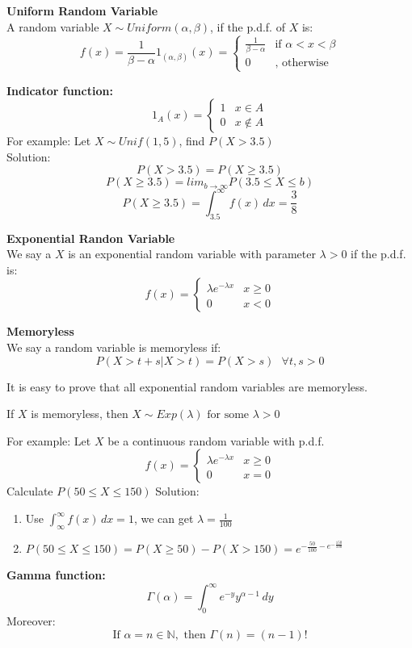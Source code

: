 \documentclass{article}
\begin{document}
\begin{definition}
    \textbf{Uniform Random Variable}\\
    A random variable $X \sim Uniform(\alpha,\beta)$, if the p.d.f. of $X$ is:
    \[
    f(x) = \frac{1}{\beta - \alpha} 1_{(\alpha, \beta)}(x) = 
    \begin{cases} 
    \frac{1}{\beta - \alpha} & \text{if } \alpha < x <\beta\\
    0 & \text{, otherwise}  
    \end{cases}
    \]
\end{definition}
\textbf{Indicator function:} 
\[
 1_A(x) =
 \begin{cases}
  1   &  x \in A \\
  0   &  x \notin A
 \end{cases}
\]
For example: Let $X \sim Unif(1,5)$, find $P(X > 3.5)$\\
Solution:
$$ P(X>3.5) = P(X \geq 3.5)$$
$$ P(X \geq 3.5) = lim_{b \rightarrow \infty}P(3.5 \leq X \leq b)$$
$$ P(X \geq 3.5) = \int^{\infty}_{3.5} f(x)\, dx = \frac{3}{8}$$

\begin{definition}
    \textbf{Exponential Randon Variable}\\
    We say a $X$ is an exponential random variable with parameter $\lambda > 0$ if the p.d.f. is:
    \[
    f(x) = 
    \begin{cases}
        \lambda e^{-\lambda x} & x \geq 0 \\
        0 & x < 0
    \end{cases}
    \]
\end{definition}

\begin{definition}
    \textbf{Memoryless}\\
    We say a random variable is memoryless if:
    $$ P(X > t+s | X>t) = P(X > s ) \text{ } \forall t,s>0$$
\end{definition}
It is easy to prove that all exponential random variables are memoryless.

\begin{theorem}
    If $X$ is memoryless, then $X \sim Exp(\lambda) \text{ for some } \lambda > 0$
\end{theorem}
For example: Let $X$ be a continuous random variable with p.d.f.
\[ 
f(x) =
\begin{cases}
    \lambda e^{-\lambda x} & x \geq 0 \\
    0 & x = 0
\end{cases}
\]
Calculate $P(50 \leq X \leq 150)$
Solution:
\begin{enumerate}
    \item Use $\int^{\infty}_{\infty}f(x) \, dx = 1$, we can get $\lambda = \frac{1}{100}$
    \item $P(50 \leq X \leq 150) = P(X \geq 50) - P(X > 150) = e^{-\frac{50}{100} - e^{-\frac{150}{100}}}$
\end{enumerate}
\begin{definition}
    \textbf{Gamma function:}
    $$ \Gamma(\alpha) = \int^{\infty}_0 e^{-y}y^{\alpha-1}\, dy$$
    Moreover:
    $$ \text{If } \alpha = n \in \mathbb{N}, \text{ then } \Gamma(n) = (n-1)!$$
\end{definition}
\end{document}
